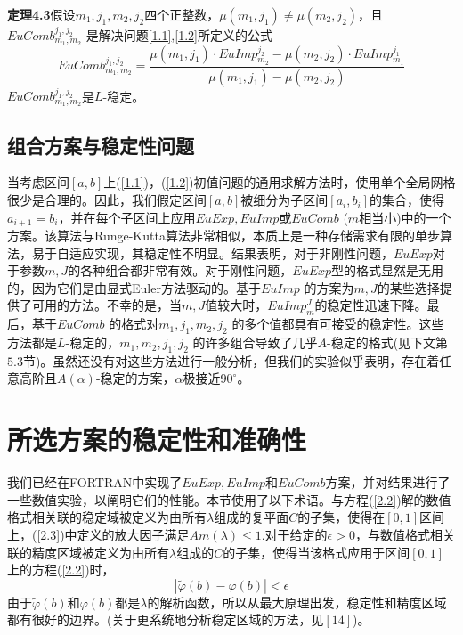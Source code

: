 \documentclass[12pt,a4paper]{article}
\begin{document}
\textbf{定理4.3}假设$m_1,j_1,m_2,j_2$四个正整数，$\mu(m_1,j_1) \neq \mu(m_2,j_2)$，且$EuComb_{m_1,m_2}^{j_1,j_2}$ 是解决问题\ref{1.1},\ref{1.2}所定义的公式\\
\begin{equation}
EuComb_{m_1,m_2}^{j_1,j_2}=\frac{\mu(m_1,j_1) \cdot EuImp_{m_2}^{j_2}-\mu(m_2,j_2) \cdot EuImp_{m_1}^{j_1}}{\mu(m_1,j_1)-\mu(m_2,j_2)}
\end{equation}
$EuComb_{m_1,m_2}^{j_1,j_2}$是$L$-稳定。\\

\subsection{组合方案与稳定性问题}

当考虑区间$[a,b]$上(\ref{1.1})，(\ref{1.2})初值问题的通用求解方法时，使用单个全局网格很少是合理的。因此，我们假定区间$[a,b]$被细分为子区间$[a_i,b_i]$的集合，使得$a_{i+1}=b_i$，并在每个子区间上应用$EuExp,EuImp$或$EuComb$ ($m$相当小)中的一个方案。该算法与Runge-Kutta算法非常相似，本质上是一种存储需求有限的单步算法，易于自适应实现，其稳定性不明显。结果表明，对于非刚性问题，$EuExp$对于参数$m,J$的各种组合都非常有效。对于刚性问题，$EuExp$型的格式显然是无用的，因为它们是由显式Euler方法驱动的。基于$EuImp$ 的方案为$m,J$的某些选择提供了可用的方法。不幸的是，当$m,J$值较大时，$EuImp^{J}_{m}$的稳定性迅速下降。最后，基于$EuComb$ 的格式对$m_1,j_1,m_2,j_2$ 的多个值都具有可接受的稳定性。这些方法都是$L$-稳定的，$m_1,m_2,j_1,j_2$ 的许多组合导致了几乎$A$-稳定的格式(见下文第$5.3$节)。虽然还没有对这些方法进行一般分析，但我们的实验似乎表明，存在着任意高阶且$A(\alpha)$-稳定的方案，$\alpha$极接近$90^{\circ}$。\\
\section{所选方案的稳定性和准确性}

我们已经在FORTRAN中实现了$EuExp,EuImp$和$EuComb$方案，并对结果进行了一些数值实验，以阐明它们的性能。本节使用了以下术语。与方程(\ref{2.2})解的数值格式相关联的稳定域被定义为由所有$\lambda$组成的复平面$C$的子集，使得在$[0,1]$区间上，(\ref{2.3})中定义的放大因子满足$Am(\lambda) \leq 1$.对于给定的$\epsilon>0$，与数值格式相关联的精度区域被定义为由所有$\lambda$组成的$C$的子集，使得当该格式应用于区间$[0,1]$上的方程(\ref{2.2})时，\\
\begin{equation}
|\widetilde {\varphi}(b)-\varphi(b)|<\epsilon
\end{equation}
由于$\widetilde {\varphi}(b)$和$\varphi(b)$都是$\lambda$的解析函数，所以从最大原理出发，稳定性和精度区域都有很好的边界。(关于更系统地分析稳定区域的方法，见$[14]$)。\\
\end{document}
